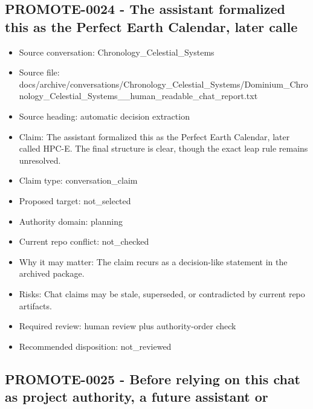 \documentclass[11pt,a4paper]{report}
\begin{document}
\subsection{PROMOTE-0024 - The assistant formalized this as the Perfect Earth Calendar, later calle}

\begin{itemize}
\item Source conversation: Chronology\_Celestial\_Systems
\item Source file: docs/archive/conversations/Chronology\_Celestial\_Systems/Dominium\_Chronology\_Celestial\_Systems\_\_human\_readable\_chat\_report.txt
\item Source heading: automatic decision extraction
\item Claim: The assistant formalized this as the Perfect Earth Calendar, later called HPC-E. The final structure is clear, though the exact leap rule remains unresolved.
\item Claim type: conversation\_claim
\item Proposed target: not\_selected
\item Authority domain: planning
\item Current repo conflict: not\_checked
\item Why it may matter: The claim recurs as a decision-like statement in the archived package.
\item Risks: Chat claims may be stale, superseded, or contradicted by current repo artifacts.
\item Required review: human review plus authority-order check
\item Recommended disposition: not\_reviewed
\end{itemize}

\subsection{PROMOTE-0025 - Before relying on this chat as project authority, a future assistant or}
\end{document}
